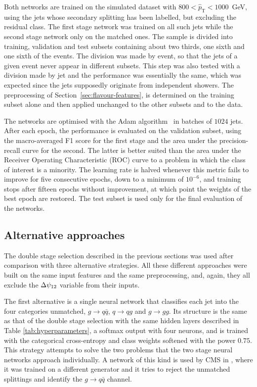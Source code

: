 Both networks are trained on the simulated dataset with
$800 < \hat{p}_{\mathrm{T}} < 1000$~GeV, using the jets whose secondary splitting
has been labelled, but excluding the residual class. The first stage network was trained 
on all such jets while the second stage network only on the matched ones. The sample is
divided into training, validation and test subsets containing about two thirds,
one sixth and one sixth of the events. The division was made by event, so that the
jets of a given event never appear in different subsets. This step was also tested
with a division made by jet and the performance was essentially the same, which was expected
since the jets supposedly originate from independent showers. The preprocessing of
Section~\ref{sec:flavour-features}, is determined on the
training subset alone and then applied unchanged to the other subsets and to the
data.

The networks are optimised with the Adam algorithm~\cite{Kingma:2014adam} in
batches of $1024$ jets. After each epoch, the performance is evaluated on the
validation subset, using the macro-averaged F1 score for the first stage and the
area under the precision-recall curve for the second. The latter is better suited
than the area under the Receiver Operating Characteristic (ROC) curve to a problem in which the class of interest is a
minority. The learning rate is halved whenever this metric fails to improve for
five consecutive epochs, down to a minimum of $10^{-6}$, and training stops after
fifteen epochs without improvement, at which point the weights of the best epoch
are restored. The test subset is used only for the final evaluation of the
networks.

\subsection{Alternative approaches}
\label{sec:flavour-alternatives}

The double stage selection described in the previous sections was used after comparison 
with three alternative strategies. All these different approaches were built on the same
input features and the same preprocessing, and, again, they all exclude the 
$\Delta\psi_{12}$ variable from their inputs.

The first alternative is a single neural network that classifies each jet into the 
four categories unmatched, $g \to q\bar{q}$, $q \to qg$ and $g \to gg$.
Its structure is the same as that of the double stage selection with the same hidden layers 
described in Table \ref{tab:hyperparameters}, a
softmax output with four neurons, and is trained with the categorical
cross-entropy and class weights softened with the power $0.75$. This strategy attempts 
to solve the two problems that the two stage neural networks approach individually. 
A network of this kind is used by CMS in \cite{CMS:2026jnt}, where it was trained on 
a different generator and it tries to 
reject the unmatched splittings and identify the $g \to q\bar{q}$ channel.

